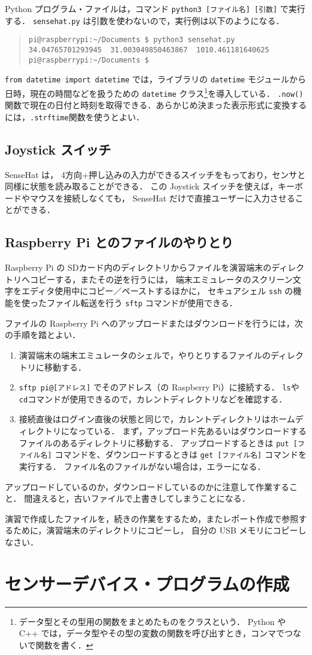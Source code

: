 \documentclass[11pt,a4,epsf]{report}
\begin{document}
Python プログラム・ファイルは，コマンド \verb+python3 [ファイル名] [引数]+ で実行する．
\verb+sensehat.py+ は引数を使わないので，実行例は以下のようになる．
\begin{quote}
\small
\begin{verbatim}
pi@raspberrypi:~/Documents $ python3 sensehat.py 
34.04765701293945  31.003049850463867  1010.461181640625 
pi@raspberrypi:~/Documents $ 
\end{verbatim}
\end{quote}
\verb+from datetime import datetime+ では，ライブラリの \verb+datetime+ モジュールから日時，現在の時間などを扱うための \verb+datetime+ クラス\footnote{データ型とその型用の関数をまとめたものをクラスという． Python や C++ では，データ型やその型の変数の関数を呼び出すとき，コンマでつないで関数を書く．}を導入している．
\verb+.now()+ 関数で現在の日付と時刻を取得できる．あらかじめ決まった表示形式に変換するには，\verb+.strftime+関数を使うとよい．

\subsection{Joystick スイッチ}
SenseHat は， 4方向+押し込みの入力ができるスイッチをもっており，センサと同様に状態を読み取ることができる．
この Joystick スイッチを使えば，キーボードやマウスを接続しなくても， SenseHat だけで直接ユーザーに入力させることができる．

\subsection{Raspberry Pi とのファイルのやりとり}

Raspberry Pi の SDカード内のディレクトリからファイルを演習端末のディレクトリへコピーする，またその逆を行うには，
端末エミュレータのスクリーン文字をエディタ使用中にコピー／ペーストするほかに，
セキュアシェル \verb+ssh+ の機能を使ったファイル転送を行う \verb+sftp+ コマンドが使用できる．

ファイルの Raspberry Pi へのアップロードまたはダウンロードを行うには，次の手順を踏とよい．
\begin{enumerate}
\item
演習端末の端末エミュレータのシェルで，やりとりするファイルのディレクトリに移動する．
\item
\verb+sftp pi@[アドレス]+ でそのアドレス（の Raspberry Pi）に接続する．
\verb+ls+や\verb+cd+コマンドが使用できるので，カレントディレクトリなどを確認する．
\item
接続直後はログイン直後の状態と同じで，カレントディレクトリはホームディレクトリになっている．
まず，アップロード先あるいはダウンロードするファイルのあるディレクトリに移動する．
アップロードするときは \verb+put [ファイル名]+ コマンドを、ダウンロードするときは \verb+get [ファイル名]+ コマンドを実行する．
ファイル名のファイルがない場合は，エラーになる．
\end{enumerate}
アップロードしているのか，ダウンロードしているのかに注意して作業すること．
間違えると，古いファイルで上書きしてしまうことになる．

\begin{excercise}
演習で作成したファイルを，続きの作業をするため，またレポート作成で参照するために，演習端末のディレクトリにコピーし，
自分の USB メモリにコピーしなさい．
\end{excercise}

\section{センサーデバイス・プログラムの作成}
\end{document}

